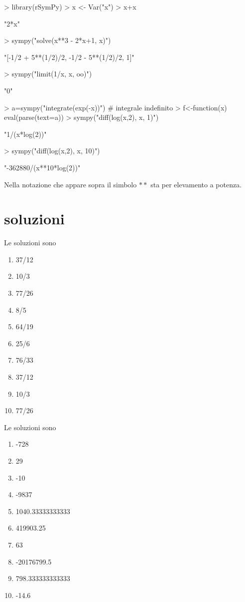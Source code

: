 \documentclass[onecolumn,11pt]{book}
\begin{document}
\begin{Schunk}
\begin{Sinput}
> library(rSymPy)
> x <- Var("x")
> x+x
\end{Sinput}
\begin{Soutput}
[1] "2*x"
\end{Soutput}
\begin{Sinput}
> sympy("solve(x**3 - 2*x+1, x)")
\end{Sinput}
\begin{Soutput}
[1] "[-1/2 + 5**(1/2)/2, -1/2 - 5**(1/2)/2, 1]"
\end{Soutput}
\begin{Sinput}
> sympy("limit(1/x, x, oo)")
\end{Sinput}
\begin{Soutput}
[1] "0"
\end{Soutput}
\begin{Sinput}
> a=sympy("integrate(exp(-x))") # integrale indefinito
>  f<-function(x)  eval(parse(text=a))
> sympy("diff(log(x,2), x, 1)")
\end{Sinput}
\begin{Soutput}
[1] "1/(x*log(2))"
\end{Soutput}
\begin{Sinput}
> sympy("diff(log(x,2), x, 10)")
\end{Sinput}
\begin{Soutput}
[1] "-362880/(x**10*log(2))"
\end{Soutput}
\end{Schunk}

Nella notazione che appare sopra il simbolo $**$ sta per elevamento a potenza.

\section{soluzioni}

Le soluzioni sono
\begin{enumerate}

\item  37/12
\item  10/3
\item  77/26
\item  8/5
\item  64/19
\item  25/6
\item  76/33
\item  37/12
\item  10/3
\item  77/26
\end{enumerate}


Le soluzioni sono
\begin{enumerate}
 \item 
-728 \item 
29 \item 
-10 \item 
-9837 \item 
1040.33333333333 \item 
419903.25 \item 
63 \item 
-20176799.5 \item 
798.333333333333 \item 
-14.6
\end{enumerate}
\end{document}
